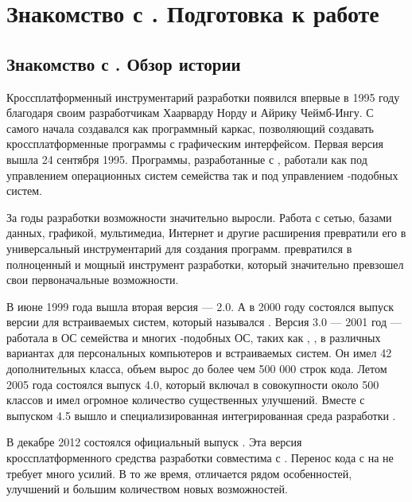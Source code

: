 
\chapter{Знакомство с . Подготовка к работе}
\section[Знакомство с \Sys{Qt}. Обзор истории]{Знакомство с . Обзор истории}
Кроссплатформенный инструментарий разработки  появился впервые в 1995 году благодаря своим разработчикам
Хаарварду Норду и Айрику Чеймб-Ингу. С самого начала создавался как программный каркас, позволяющий 
создавать кроссплатформенные программы с графическим интерфейсом. Первая версия  вышла 
24 сентября 1995. Программы, разработанные с , работали как под управлением операционных 
систем семейства  так и под управлением -подобных систем.

За годы разработки возможности  значительно выросли. Работа с сетью, базами данных, графикой,
мультимедиа, Интернет и другие расширения превратили его в универсальный инструментарий для создания программ. 
 превратился в полноценный и мощный инструмент разработки, который значительно превзошел свои первоначальные
возможности.

В июне 1999 года вышла вторая версия ---  2.0. А в 2000 году состоялся выпуск версии для встраиваемых
систем, который назывался . Версия  3.0 --- 2001 год --- работала в ОС семейства 
 и многих -подобных ОС, таких как , , в различных 
вариантах  для персональных компьютеров и встраиваемых
систем. Он имел 42 дополнительных класса, объем вырос до более чем 500 000 строк кода. Летом 2005 года состоялся выпуск
 4.0, который включал в совокупности около 500 классов и имел огромное количество существенных улучшений. Вместе с
выпуском  4.5 вышло и специализированная интегрированная
среда разработки .

В декабре 2012 состоялся официальный выпуск . Эта версия кроссплатформенного средства разработки
совместима с . Перенос кода с  на  не требует много усилий. В то же время, 
 отличается рядом особенностей,
улучшений и большим количеством новых возможностей.


